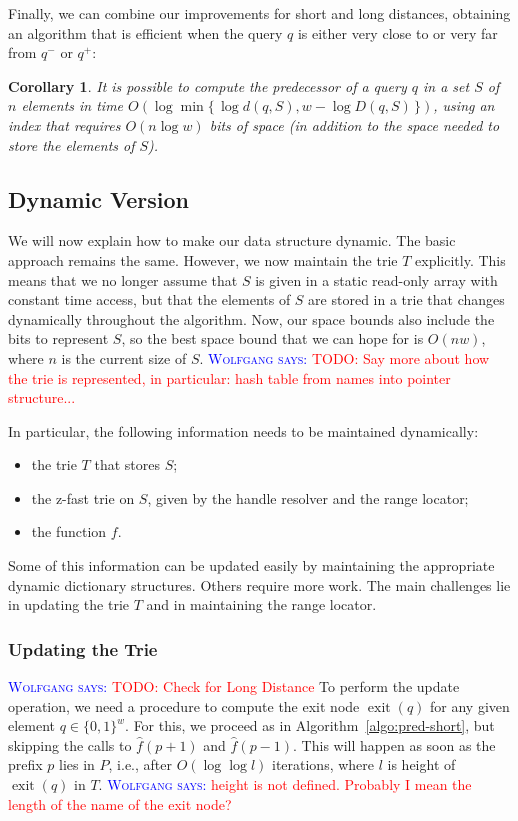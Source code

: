 \documentclass[a4paper,11pt]{article}
\newtheorem{corollary}[theorem]{Corollary}
\newcommand{\?}{\mskip1.5mu}
\DeclareMathOperator{\exit}{exit}
\newcommand{\aremark}[3]{\textcolor{blue}{\textsc{#1 #2:}}
  \textcolor{red}{\textsf{#3}}}
\newcommand{\wolfgang}[2][says]{\aremark{Wolfgang}{#1}{#2}}
\begin{document}
Finally, we can combine our improvements for short and long 
distances, obtaining an algorithm that is
efficient when the query $q$ is either very close to or very far 
from $q^-$ or $q^+$:

\begin{corollary}
It is possible to compute the predecessor of a query $q$ in a set $S$
of $n$ elements in time $O(\log \min \{\,\log d(q, S), w - \log D(q,S)\,\})$, 
using an index that
requires $O(n \log w)$ bits of space (in addition to the space
needed to store the elements of $S$).
\end{corollary}

\subsection{Dynamic Version}

We will now explain how to make our data
structure dynamic. 
The basic approach remains the same.
However, we now maintain the trie $T$ explicitly. 
This means that we no longer assume that $S$
is given in a static read-only array with constant
time access, but that the elements of $S$
are stored in a trie that changes dynamically throughout
the algorithm. Now, our space bounds also include
the bits to represent $S$, so the best space bound
that we can hope for is $O(nw)$, where $n$ is the
current size of $S$.
\wolfgang{TODO: Say more about how the trie is represented,
in particular: hash table from names into pointer structure...}

In particular, the following information needs to
be maintained dynamically:
\begin{itemize}
  \item the trie $T$ that stores $S$;
  \item the z-fast trie on $S$, given by the
    handle resolver and the range locator;
  \item the function $f$.
\end{itemize}
Some of this information can be updated easily
by maintaining the appropriate dynamic dictionary 
structures. Others require more work.
The main challenges lie in updating the trie $T$ and
in maintaining the range locator.

\subsubsection{Updating the Trie}

\wolfgang{TODO: Check for Long Distance}
To perform the update operation, we need a
procedure to compute the exit node
$\exit(q)$ for any given element $q \in \{0, 1\}^w$. 
For this, we proceed as in 
Algorithm~\ref{algo:pred-short}, but skipping 
the calls to $\widehat f(p + 1)$ and
$\widehat f(p - 1)$. This will happen as 
soon as the prefix $p$ lies in $P$, i.e., after
$O(\log \log l)$ iterations, where $l$
is height of $\exit(q)$ in $T$.
\wolfgang{height is not defined. Probably I mean the length of the
name of the exit node?}
\end{document}
